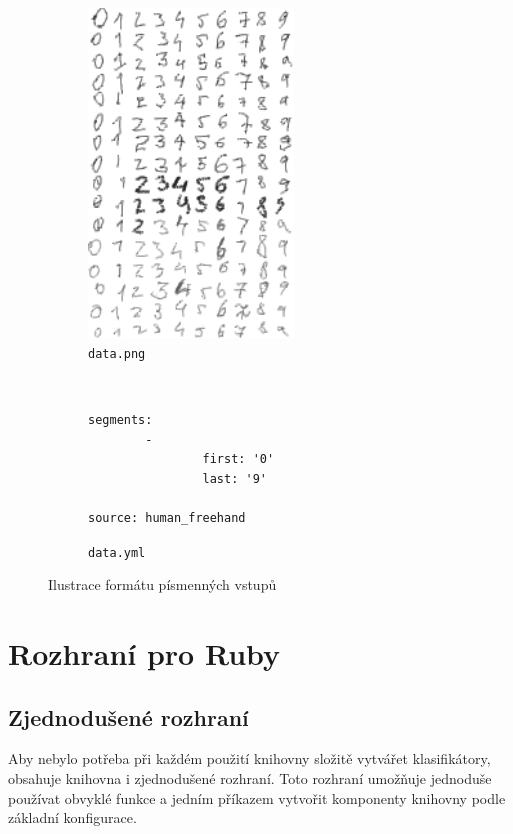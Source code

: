 \documentclass[a4paper]{article}
\begin{document}
\begin{figure}[h]
        \centering
        \begin{subfigure}[b]{0.5\textwidth}
		\centering
                \includegraphics[width=0.6\textwidth]{letter_dataset_sample}
		\caption{\texttt{data.png}}
        \end{subfigure}%
        ~ %
        \begin{subfigure}[b]{0.4\textwidth}
\begin{lstlisting}
segments:
        -
                first: '0'
                last: '9'

source: human_freehand
\end{lstlisting}
		\caption{\texttt{data.yml}}
        \end{subfigure}
        \caption{Ilustrace formátu písmenných vstupů}
\end{figure}

\section{Rozhraní pro Ruby}

\subsection{Zjednodušené rozhraní}
Aby nebylo potřeba při každém použití knihovny složitě vytvářet klasifikátory,
obsahuje knihovna i zjednodušené rozhraní. Toto rozhraní umožňuje jednoduše
používat obvyklé funkce a jedním příkazem vytvořit komponenty knihovny podle
základní konfigurace.
\end{document}
